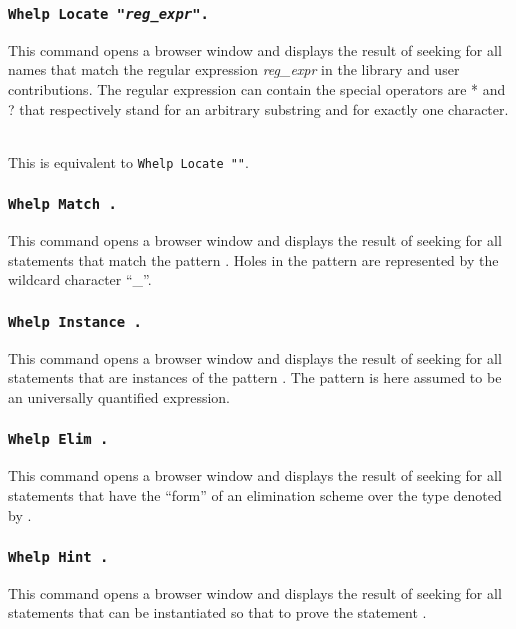 \subsubsection{\tt Whelp Locate "{\sl reg\_expr}".
}

This command opens a browser window and displays the result of seeking
for all names that match the regular expression {\sl reg\_expr} in the
{\Coq} library and user contributions. The regular expression can
contain the special operators are * and ? that respectively stand for
an arbitrary substring and for exactly one character.

\\
This is equivalent to {\tt Whelp Locate "{\ident}"}.

\subsubsection{\tt Whelp Match {\pattern}.
}

This command opens a browser window and displays the result of seeking
for all statements that match the pattern {\pattern}. Holes in the
pattern are represented by the wildcard character ``\_''.

\subsubsection{\tt Whelp Instance {\pattern}.}

This command opens a browser window and displays the result of seeking
for all statements that are instances of the pattern {\pattern}. The
pattern is here assumed to be an universally quantified expression.

\subsubsection{\tt Whelp Elim {\qualid}.}

This command opens a browser window and displays the result of seeking
for all statements that have the ``form'' of an elimination scheme
over the type denoted by {\qualid}.

\subsubsection{\tt Whelp Hint {\term}.}

This command opens a browser window and displays the result of seeking
for all statements that can be instantiated so that to prove the
statement {\term}.

